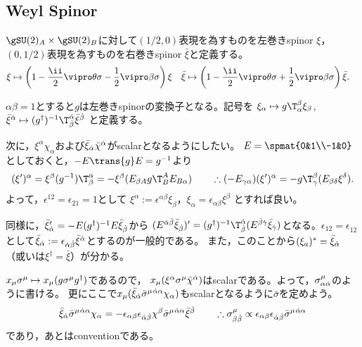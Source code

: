 \subsection{Weyl Spinor}
$\gSU(2)_A\times\gSU(2)_B$に対して$(1/2,0)$表現を為すものを左巻きspinor $\xi$，$(0,1/2)$表現を為すものを右巻きspinor $\bar\xi$と定義する。
\begin{align}
 \xi&\mapsto\left(1-\frac\ii2\vipro\theta\sigma-\frac12\vipro\beta\sigma\right)\xi&
 \bar\xi&\mapsto\left(1-\frac\ii2\vipro\theta\sigma+\frac12\vipro\beta\sigma\right)\bar\xi.
\end{align}

$\alpha\beta=1$とすると$g$は左巻きspinorの変換子となる。記号を
$\xi_\alpha\mapsto g\T_\alpha^\beta\xi_\beta$,
$\bar\xi^\dalpha\mapsto (g^\dagger)^{-1}\T^\dalpha_\dbeta\bar\xi^\dbeta$
と定義する。

次に，$\xi^\alpha\chi_\alpha$および$\bar\xi_{\dot\alpha}\bar\chi^{\dot\alpha}$がscalarとなるようにしたい。
$E=\spmat{0&1\\-1&0}$としておくと，$-E\trans{g}E=g^{-1}$より
\begin{equation}
 (\xi')^\alpha=\xi^\beta(g^{-1})\T_\beta^\alpha
              =-\xi^\beta(E_{\beta A}g\T_B^AE_{B\alpha})\qquad\therefore (-E_{\gamma\alpha})(\xi')^\alpha = -g\T_\gamma^\beta(E_{\beta\delta}\xi^\delta).
\end{equation}
よって，$\epsilon^{12}=\epsilon_{21}=1$として
$\xi^\alpha:=\epsilon^{\alpha\beta}\xi_\beta$，$\xi_\alpha=\epsilon_{\alpha\beta}\xi^\beta$
とすれば良い。


同様に，$\bar\xi'_{\dot\alpha}=-E(g^\dagger)^{-1}E\bar\xi_{\dot\beta}$から
$(E^{\dalpha\dbeta}\bar\xi_\dbeta)'=(g^\dagger)^{-1}{}\T^\dalpha_\dbeta (E^{\dbeta\dgamma}\bar\xi_\dgamma)$となる。$\epsilon_{12}=\epsilon_{\dot1\dot2}$として$\bar\xi_{\dot\alpha}:=\epsilon_{{\dot\alpha}{\dot\beta}}\bar\xi^{\dot\alpha}$とするのが一般的である。
また，このことから$(\xi_a)^*=\bar\xi_{\dot\alpha}$（或いは$\xi^\dagger=\bar\xi$）が分かる。

$x_\mu\sigma^\mu\mapsto x_\mu(g\sigma^\mu g^\dagger)$であるので，
$x_\mu(\xi^\alpha \sigma^\mu \bar\chi^{\dot\alpha})$はscalarである。よって，$\sigma^\mu_{\alpha{\dot\alpha}}$のように書ける。
更にここで$x_\mu(\bar\xi_{\dot\alpha}\bar\sigma^\mu{}^{{\dot\alpha}\alpha}\chi_\alpha)$もscalarとなるように$\bar\sigma$を定めよう。
\begin{equation}
 \bar\xi_{\dot\alpha}\bar\sigma^\mu{}^{{\dot\alpha}\alpha}\chi_\alpha=-\epsilon_{\alpha\beta}\epsilon_{{\dot\alpha}{\dot\beta}}\chi^\beta\bar\sigma^\mu{}^{{\dot\alpha}\alpha}\bar\xi^{\dot\beta}
\qquad\therefore \sigma^\mu_{\beta{\dot\beta}}\propto \epsilon_{\alpha\beta}\epsilon_{{\dot\alpha}{\dot\beta}}\bar\sigma^\mu{}^{{\dot\alpha}\alpha}
\end{equation}
であり，あとはconventionである。

